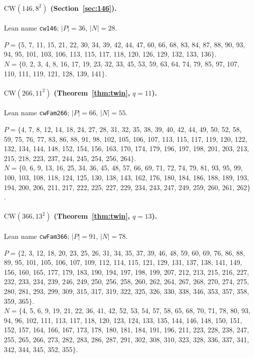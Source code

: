 \paragraph{$\mathrm{CW}(146,8^2)$ (Section~\ref{sec:146}).} Lean name \texttt{cw146}; $|P|=36$, $|N|=28$.\\
{\footnotesize\raggedright $P=\{$5, 7, 11, 15, 21, 22, 30, 34, 39, 42, 44, 47, 60, 66, 68, 83, 84, 87, 88, 90, 93, 94, 95, 101, 103, 106, 113, 115, 117, 118, 120, 126, 129, 132, 133, 136$\}$.\\
$N=\{$0, 2, 3, 4, 8, 16, 17, 19, 23, 32, 33, 45, 53, 59, 63, 64, 74, 79, 85, 97, 107, 110, 111, 119, 121, 128, 139, 141$\}$.\par}

\paragraph{$\mathrm{CW}(266,11^2)$ (Theorem~\ref{thm:twin}, $q=11$).} Lean name \texttt{cwFam266}; $|P|=66$, $|N|=55$.\\
{\footnotesize\raggedright $P=\{$4, 7, 8, 12, 14, 18, 24, 27, 28, 31, 32, 35, 38, 39, 40, 42, 44, 49, 50, 52, 58, 59, 75, 76, 77, 83, 86, 88, 91, 98, 102, 105, 106, 107, 113, 115, 117, 119, 120, 122, 132, 134, 144, 148, 152, 154, 156, 163, 170, 174, 179, 196, 197, 198, 201, 203, 213, 215, 218, 223, 237, 244, 245, 254, 256, 264$\}$.\\
$N=\{$0, 6, 9, 13, 16, 25, 34, 36, 45, 48, 57, 66, 69, 71, 72, 74, 79, 81, 93, 95, 99, 100, 103, 108, 118, 124, 125, 130, 138, 143, 162, 176, 180, 184, 186, 188, 189, 193, 194, 200, 206, 211, 217, 222, 225, 227, 229, 234, 243, 247, 249, 259, 260, 261, 262$\}$.\par}

\paragraph{$\mathrm{CW}(366,13^2)$ (Theorem~\ref{thm:twin}, $q=13$).} Lean name \texttt{cwFam366}; $|P|=91$, $|N|=78$.\\
{\footnotesize\raggedright $P=\{$2, 3, 12, 18, 20, 23, 25, 26, 31, 34, 35, 37, 39, 46, 48, 59, 60, 69, 76, 86, 88, 89, 95, 101, 105, 106, 107, 109, 112, 114, 115, 121, 129, 131, 137, 138, 141, 149, 156, 160, 165, 177, 179, 183, 190, 194, 197, 198, 199, 207, 212, 213, 215, 216, 227, 232, 233, 234, 239, 246, 249, 250, 256, 258, 260, 262, 264, 267, 268, 270, 274, 275, 280, 281, 293, 299, 309, 315, 317, 319, 322, 325, 326, 330, 338, 346, 353, 357, 358, 359, 365$\}$.\\
$N=\{$4, 5, 6, 9, 19, 21, 22, 36, 41, 42, 52, 53, 54, 57, 58, 65, 68, 70, 71, 78, 80, 93, 94, 96, 102, 111, 113, 117, 118, 120, 123, 124, 133, 135, 144, 146, 148, 150, 151, 152, 157, 164, 166, 167, 173, 178, 180, 181, 184, 191, 196, 211, 223, 228, 238, 247, 255, 265, 266, 273, 282, 283, 286, 287, 291, 302, 308, 310, 323, 328, 336, 337, 341, 342, 344, 345, 352, 355$\}$.\par}

